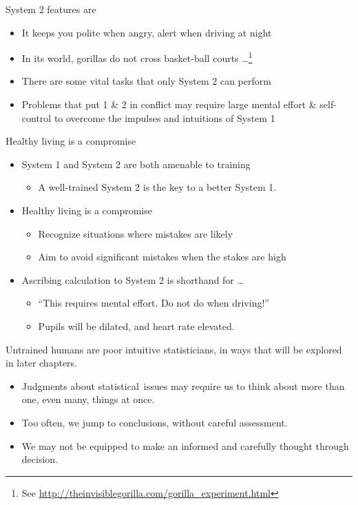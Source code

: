 \documentclass[
  10pt,
  b5paper]{book}
\providecommand{\tightlist}{%
  \setlength{\itemsep}{0pt}\setlength{\parskip}{0pt}}
\begin{document}
System 2 features are

\begin{itemize}
\tightlist
\item
  It keeps you polite when angry, alert when driving at night
\item
  In its world, gorillas do not cross basket-ball courts \ldots{}\footnote{See \url{http://theinvisiblegorilla.com/gorilla_experiment.html}}
\item
  There are some vital tasks that only System 2 can perform
\item
  Problems that put 1 \& 2 in conflict may require large mental effort \& self-control to overcome the impulses and intuitions of System 1
\end{itemize}

Healthy living is a compromise

\begin{itemize}
\tightlist
\item
  System 1 and System 2 are both amenable to training

  \begin{itemize}
  \tightlist
  \item
    A well-trained System 2 is the key to a better System 1.\\
  \end{itemize}
\item
  Healthy living is a compromise

  \begin{itemize}
  \tightlist
  \item
    Recognize situations where mistakes are likely
  \item
    Aim to avoid significant mistakes when the stakes are high
  \end{itemize}
\item
  Ascribing calculation to System 2 is shorthand for \ldots{}

  \begin{itemize}
  \tightlist
  \item
    ``This requires mental effort. Do not do when driving!''
  \item
    Pupils will be dilated, and heart rate elevated.
  \end{itemize}
\end{itemize}

Untrained humans are poor intuitive statisticians, in ways that will be explored in later chapters.

\begin{itemize}
\tightlist
\item
  Judgments about statistical~issues may require us to think about more than one, even many, things at once.
\item
  Too often, we jump to conclusions, without careful assessment.
\item
  We may not be equipped to make an informed and carefully thought through decision.
\end{itemize}
\end{document}
